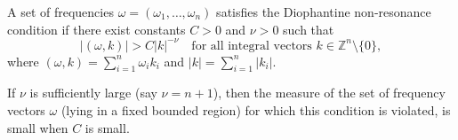 A set of frequencies $\omega = (\omega_1, \ldots, \omega_n)$ satisfies the Diophantine non-resonance condition if there exist constants $C > 0$ and $\nu > 0$ such that
$$|(\omega, k)| > C|k|^{-\nu} \quad \text{for all integral vectors } k \in \mathbb{Z}^n \setminus \{0\},$$
where $(\omega, k) = \sum_{i=1}^n \omega_i k_i$ and $|k| = \sum_{i=1}^n |k_i|$.

If $\nu$ is sufficiently large (say $\nu = n + 1$), then the measure of the set of frequency vectors $\omega$ (lying in a fixed bounded region) for which this condition is violated, is small when $C$ is small.
